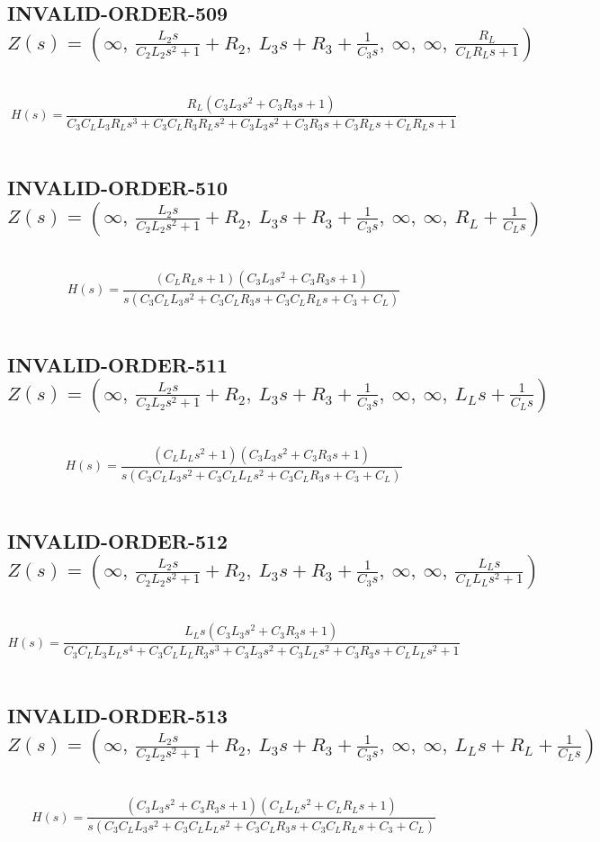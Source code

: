 \documentclass{article}
\begin{document}
\subsection{INVALID-ORDER-509 $Z(s) = \left( \infty, \  \frac{L_{2} s}{C_{2} L_{2} s^{2} + 1} + R_{2}, \  L_{3} s + R_{3} + \frac{1}{C_{3} s}, \  \infty, \  \infty, \  \frac{R_{L}}{C_{L} R_{L} s + 1}\right)$ } \ 
\textbf{\[H(s) = \frac{R_{L} \left(C_{3} L_{3} s^{2} + C_{3} R_{3} s + 1\right)}{C_{3} C_{L} L_{3} R_{L} s^{3} + C_{3} C_{L} R_{3} R_{L} s^{2} + C_{3} L_{3} s^{2} + C_{3} R_{3} s + C_{3} R_{L} s + C_{L} R_{L} s + 1}\] } \ 
\subsection{INVALID-ORDER-510 $Z(s) = \left( \infty, \  \frac{L_{2} s}{C_{2} L_{2} s^{2} + 1} + R_{2}, \  L_{3} s + R_{3} + \frac{1}{C_{3} s}, \  \infty, \  \infty, \  R_{L} + \frac{1}{C_{L} s}\right)$ } \ 
\textbf{\[H(s) = \frac{\left(C_{L} R_{L} s + 1\right) \left(C_{3} L_{3} s^{2} + C_{3} R_{3} s + 1\right)}{s \left(C_{3} C_{L} L_{3} s^{2} + C_{3} C_{L} R_{3} s + C_{3} C_{L} R_{L} s + C_{3} + C_{L}\right)}\] } \ 
\subsection{INVALID-ORDER-511 $Z(s) = \left( \infty, \  \frac{L_{2} s}{C_{2} L_{2} s^{2} + 1} + R_{2}, \  L_{3} s + R_{3} + \frac{1}{C_{3} s}, \  \infty, \  \infty, \  L_{L} s + \frac{1}{C_{L} s}\right)$ } \ 
\textbf{\[H(s) = \frac{\left(C_{L} L_{L} s^{2} + 1\right) \left(C_{3} L_{3} s^{2} + C_{3} R_{3} s + 1\right)}{s \left(C_{3} C_{L} L_{3} s^{2} + C_{3} C_{L} L_{L} s^{2} + C_{3} C_{L} R_{3} s + C_{3} + C_{L}\right)}\] } \ 
\subsection{INVALID-ORDER-512 $Z(s) = \left( \infty, \  \frac{L_{2} s}{C_{2} L_{2} s^{2} + 1} + R_{2}, \  L_{3} s + R_{3} + \frac{1}{C_{3} s}, \  \infty, \  \infty, \  \frac{L_{L} s}{C_{L} L_{L} s^{2} + 1}\right)$ } \ 
\textbf{\[H(s) = \frac{L_{L} s \left(C_{3} L_{3} s^{2} + C_{3} R_{3} s + 1\right)}{C_{3} C_{L} L_{3} L_{L} s^{4} + C_{3} C_{L} L_{L} R_{3} s^{3} + C_{3} L_{3} s^{2} + C_{3} L_{L} s^{2} + C_{3} R_{3} s + C_{L} L_{L} s^{2} + 1}\] } \ 
\subsection{INVALID-ORDER-513 $Z(s) = \left( \infty, \  \frac{L_{2} s}{C_{2} L_{2} s^{2} + 1} + R_{2}, \  L_{3} s + R_{3} + \frac{1}{C_{3} s}, \  \infty, \  \infty, \  L_{L} s + R_{L} + \frac{1}{C_{L} s}\right)$ } \ 
\textbf{\[H(s) = \frac{\left(C_{3} L_{3} s^{2} + C_{3} R_{3} s + 1\right) \left(C_{L} L_{L} s^{2} + C_{L} R_{L} s + 1\right)}{s \left(C_{3} C_{L} L_{3} s^{2} + C_{3} C_{L} L_{L} s^{2} + C_{3} C_{L} R_{3} s + C_{3} C_{L} R_{L} s + C_{3} + C_{L}\right)}\] } \ 
\end{document}
